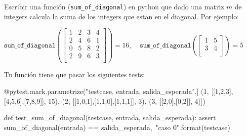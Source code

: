\begin{exercise}
Escribir una función (\texttt{sum\_of\_diagonal}) en python que dado una matriz $m$ de integers calcula la suma de los integers que estan en el diagonal.
Por ejemplo:

$
\texttt{sum\_of\_diagonal}(
\begin{bmatrix}
    1 & 2 & 3 & 4 \\
    2 & 4 & 6 & 1 \\
    0 & 5 & 8 & 2 \\
    2 & 9 & 6 & 3 \\
\end{bmatrix})
 = 16
$, $\;\;$
$
\texttt{sum\_of\_diagonal}(
\begin{bmatrix}
    1 & 5   \\
    3 & 4  \\
\end{bmatrix})
 = 5
$

Tu función tiene que pasar los siguientes tests:

\begin{small}
\begin{python}
@pytest.mark.parametrize("testcase, entrada, salida_esperada",[
(1, [[1,2,3],[4,5,6],[7,8,9]], 15),
(2, [[1,0,1],[1,1,0],[1,1,1]], 3),
(3, [[2,0],[0,2]], 4)])

def test_sum_of_diagonal(testcase, entrada, salida_esperada):
    assert sum_of_diagonal(entrada) == salida_esperada,\
           "caso {0}".format(testcase)
\end{python}
\end{small}


\end{exercise}